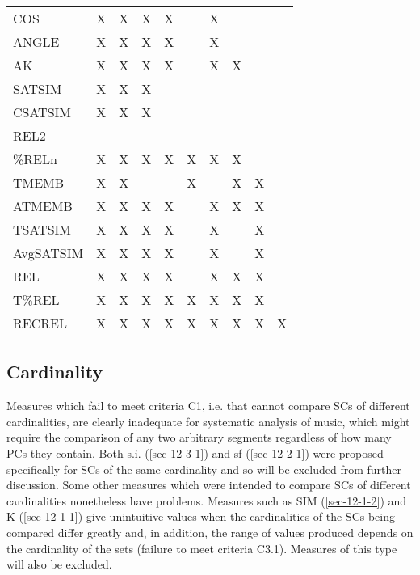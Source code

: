\documentclass{article}
\begin{document}
\begin{table}[htb]
\begin{center}
\begin{tabular}{llllllllll}
 COS         &  X   &  X   &  X     &  X     &        &  X     &      &      &      \\
 ANGLE       &  X   &  X   &  X     &  X     &        &  X     &      &      &      \\
 AK          &  X   &  X   &  X     &  X     &        &  X     &  X   &      &      \\
 SATSIM      &  X   &  X   &  X     &        &        &        &      &      &      \\
 CSATSIM     &  X   &  X   &  X     &        &        &        &      &      &      \\
 REL2        &      &      &        &        &        &        &      &      &      \\
 \%RELn      &  X   &  X   &  X     &  X     &  X     &  X     &  X   &      &      \\
 TMEMB       &  X   &  X   &        &        &  X     &        &  X   &  X   &      \\
 ATMEMB      &  X   &  X   &  X     &  X     &        &  X     &  X   &  X   &      \\
 TSATSIM     &  X   &  X   &  X     &  X     &        &  X     &      &  X   &      \\
 AvgSATSIM   &  X   &  X   &  X     &  X     &        &  X     &      &  X   &      \\
 REL         &  X   &  X   &  X     &  X     &        &  X     &  X   &  X   &      \\
 T\%REL      &  X   &  X   &  X     &  X     &  X     &  X     &  X   &  X   &      \\
 RECREL      &  X   &  X   &  X     &  X     &  X     &  X     &  X   &  X   &  X   \\
\hline
\end{tabular}
\end{center}
\end{table}
\subsection{Cardinality}
\label{sec-6-2}

Measures which fail to meet criteria C1, i.e. that cannot compare SCs
of different cardinalities, are clearly inadequate for systematic
analysis of music, which might require the comparison of any two
arbitrary segments regardless of how many PCs they contain. Both
s.i. (\ref{sec-12-3-1}) and sf (\ref{sec-12-2-1}) were proposed specifically for SCs of the same
cardinality and so will be excluded from further discussion. Some
other measures which were intended to compare SCs of different
cardinalities nonetheless have problems. Measures such as SIM (\ref{sec-12-1-2})
and K (\ref{sec-12-1-1}) give unintuitive values when the cardinalities of the SCs
being compared differ greatly and, in addition, the range of values
produced depends on the cardinality of the sets (failure to meet
criteria C3.1). Measures of this type will also be excluded.
\end{document}
